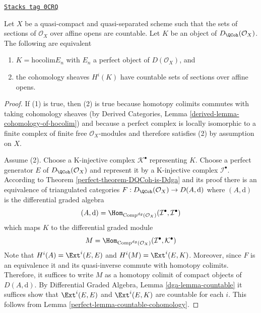 \begin{lemma}[Countable]
\label{perfect-lemma-countable}
\href{https://stacks.math.columbia.edu/tag/0CRQ}{\texttt{Stacks tag 0CRQ}}

Let $X$ be a quasi-compact and quasi-separated scheme such that
the sets of sections of $\mathcal{O}_X$ over affine opens are countable.
Let $K$ be an object of $D_\QCoh(\mathcal{O}_X)$. The
following are equivalent
\begin{enumerate}
\item $K = \text{hocolim} E_n$ with $E_n$ a perfect object of
$D(\mathcal{O}_X)$, and
\item the cohomology sheaves $H^i(K)$ have countable
sets of sections over affine opens.
\end{enumerate}
\end{lemma}

\begin{proof}

If (1) is true, then (2) is true because homotopy colimits commutes
with taking cohomology sheaves
(by Derived Categories, Lemma \ref{derived-lemma-cohomology-of-hocolim})
and because a perfect complex is
locally isomorphic to a finite complex of finite free $\mathcal{O}_X$-modules
and therefore satisfies (2) by assumption on $X$.

\medskip\noindent
Assume (2).
Choose a K-injective complex $\mathcal{K}^\bullet$ representing $K$.
Choose a perfect generator $E$ of $D_\QCoh(\mathcal{O}_X)$ and
represent it by a K-injective complex $\mathcal{I}^\bullet$.
According to Theorem \ref{perfect-theorem-DQCoh-is-Ddga}
and its proof there is an equivalence
of triangulated categories $F : D_\QCoh(\mathcal{O}_X) \to D(A, \text{d})$
where $(A, \text{d})$ is the differential graded algebra
$$
(A, \text{d}) =
\Hom_{\text{Comp}^{dg}(\mathcal{O}_X)}
(\mathcal{I}^\bullet, \mathcal{I}^\bullet)
$$
which maps $K$ to the differential graded module
$$
M = \Hom_{\text{Comp}^{dg}(\mathcal{O}_X)}
(\mathcal{I}^\bullet, \mathcal{K}^\bullet)
$$
Note that $H^i(A) = \Ext^i(E, E)$ and
$H^i(M) = \Ext^i(E, K)$.
Moreover, since $F$ is an equivalence it and its quasi-inverse commute
with homotopy colimits.
Therefore, it suffices to write $M$ as a homotopy colimit
of compact objects of $D(A, \text{d})$.
By Differential Graded Algebra, Lemma \ref{dga-lemma-countable}
it suffices show that $\Ext^i(E, E)$ and
$\Ext^i(E, K)$ are countable for each $i$.
This follows from Lemma \ref{perfect-lemma-countable-cohomology}.
\end{proof}

